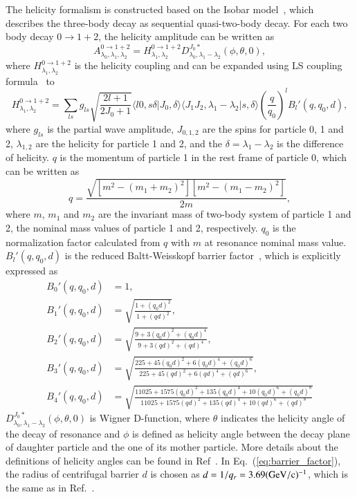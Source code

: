 The helicity formalism is constructed based on the Isobar model~\cite{Walker:1968xu}, which describes the three-body decay as sequential quasi-two-body decay. For each two body decay $0 \to 1 + 2$, the helicity amplitude can be written as
\begin{equation}\label{eq:2_body_helicity}
    A^{0 \rightarrow 1+2}_{\lambda_{0},\lambda_{1},\lambda_{2}} = H_{\lambda_{1},\lambda_{2}}^{0 \rightarrow 1+2} D^{J_{0}\ast}_{\lambda_{0},\lambda_{1}-\lambda_{2}}(\phi,\theta,0),
\end{equation}
where $H_{\lambda_{1},\lambda_{2}}^{0 \rightarrow 1+2}$ is the helicity coupling and can be expanded using LS coupling formula~\cite{PhysRevD.56.4419,PhysRevD.57.431} to
\begin{equation}
    H_{\lambda_{1},\lambda_{2}}^{0 \rightarrow 1+2} =
\sum_{ls} g_{ls} \sqrt{\frac{2l+1}{2 J_{0}+1}} \langle l0, s\delta|J_{0},\delta\rangle \langle J_{1} J_{2}, \lambda_{1} -\lambda_{2} | s, \delta \rangle \left(\frac{q}{q_0}\right)^l B_{l}'(q, q_0, d), 
\end{equation}
where $g_{ls}$ is the partial wave amplitude, $J_{0,1,2}$ are the spins for particle 0, 1 and 2, $\lambda_{1,2}$ are the helicity for particle 1 and 2, and the $\delta = \lambda_1 - \lambda_2$ is the difference of helicity. $q$ is the momentum of particle 1 in the rest frame of particle 0, which can be written as
\begin{equation}
    q = \frac{\sqrt{[m^2 - (m_1+m_2)^2][m^2 - (m_1 - m_2)^2]}}{2m},
\end{equation}
where $m$, $m_1$ and $m_2$ are the invariant mass of two-body system of particle 1 and 2, the nominal mass values of particle 1 and 2, respectively. $q_0$ is the normalization factor calculated from $q$ with $m$ at resonance nominal mass value. $B_{l}'(q, q_0, d)$ is the reduced Baltt-Weisskopf barrier factor~\cite{Blatt:1952ije}, which is explicitly expressed as
\begin{equation}\label{eq:barrier_factor}
    \begin{split}
    B_{0}'(q, q_0, d) &= 1, \\
    B_{1}'(q, q_0, d) &= \sqrt{\frac{1+(q_0d)^2}{1+(qd)^2}}, \\
    B_{2}'(q, q_0, d) &= \sqrt{\frac{9+3(q_0d)^2+(q_0d)^4}{9+3(qd)^2+(qd)^4}}, \\
    B_{3}'(q, q_0, d) &= \sqrt{\frac{225+45(q_0d)^2+6(q_0d)^4+(q_0d)^6}{225+45(qd)^2+6(qd)^4+(qd)^6}}, \\
    B_{4}'(q, q_0, d) &= \sqrt{\frac{11025+1575(q_0d)^2+135(q_0d)^4+10(q_0d)^6+(q_0d)^8}{11025+1575(qd)^2+135(qd)^4+10(qd)^6+(qd)^8}}
    \end{split}
\end{equation}
$D^{J_{0}\ast}_{\lambda_{0},\lambda_{1}-\lambda_{2}}(\phi,\theta,0)$ is Wigner D-function, where $\theta$ indicates the helicity angle of the decay of resonance and $\phi$ is defined as helicity angle between the decay plane of daughter particle and the one of its mother particle. More details about the definitions of helicity angles can be found in Ref~\cite{Wang:2020giv}. In Eq.~(\ref{eq:barrier_factor}), the radius of centrifugal barrier $d$ is chosen as $d=1/q_r=3.69(\rm{GeV}/c)^{-1}$, which is the same as in Ref.~\cite{BESIII:2019dme}.


